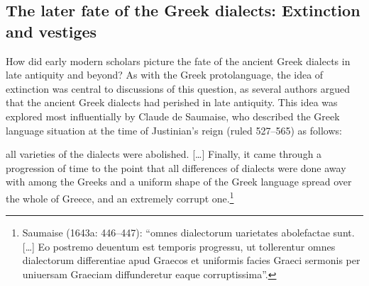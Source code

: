 \begin{styleStandard}
\end{styleStandard}

\subsection{The later fate of the Greek dialects: Extinction and vestiges}
\hypertarget{Toc19704839}{}\begin{styleStandard}
How did early modern scholars picture the fate of the ancient Greek dialects in late antiquity and beyond? As with the Greek protolanguage, the idea of extinction was central to discussions of this question, as several authors argued that the ancient Greek dialects had perished in late antiquity. This idea was explored most influentially by Claude de Saumaise, who described the Greek language situation at the time of Justinian’s reign (ruled 527–565) as follows:
\end{styleStandard}

\begin{styleQuote}
all varieties of the dialects were abolished. […] Finally, it came through a progression of time to the point that all differences of dialects were done away with among the Greeks and a uniform shape of the Greek language spread over the whole of Greece, and an extremely corrupt one.\footnote{ Saumaise (1643a: 446–447): “omnes dialectorum uarietates abolefactae sunt. […] Eo postremo deuentum est temporis progressu, ut tollerentur omnes dialectorum differentiae apud Graecos et uniformis facies Graeci sermonis per uniuersam Graeciam diffunderetur eaque corruptissima”.}
\end{styleQuote}

